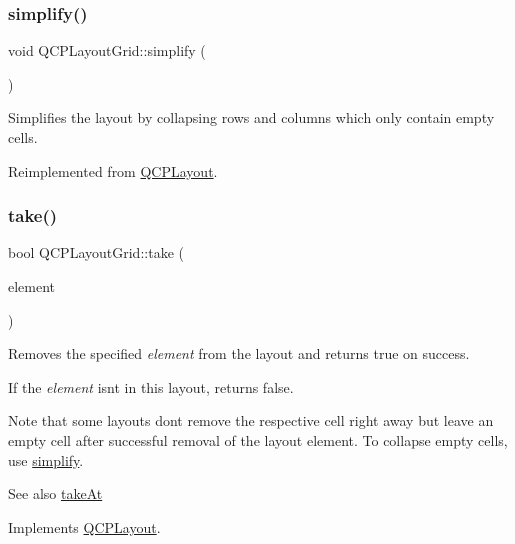 \subsubsection{\texorpdfstring{simplify()}{simplify()}}
{\footnotesize\ttfamily void Q\+C\+P\+Layout\+Grid\+::simplify (\begin{DoxyParamCaption}{ }\end{DoxyParamCaption})\hspace{0.3cm}{\ttfamily [virtual]}}

Simplifies the layout by collapsing rows and columns which only contain empty cells. 

Reimplemented from \hyperlink{class_q_c_p_layout_a41e6ac049143866e8f8b4964efab01b2}{Q\+C\+P\+Layout}.

\mbox{\label{class_q_c_p_layout_grid_aee961c2eb6cf8a85dcbc5a7d7b6c1a00}} 
\subsubsection{\texorpdfstring{take()}{take()}}
{\footnotesize\ttfamily bool Q\+C\+P\+Layout\+Grid\+::take (\begin{DoxyParamCaption}\item[{\hyperlink{class_q_c_p_layout_element}{Q\+C\+P\+Layout\+Element} $\ast$}]{element }\end{DoxyParamCaption})\hspace{0.3cm}{\ttfamily [virtual]}}

Removes the specified {\itshape element} from the layout and returns true on success.

If the {\itshape element} isn\textquotesingle{}t in this layout, returns false.

Note that some layouts don\textquotesingle{}t remove the respective cell right away but leave an empty cell after successful removal of the layout element. To collapse empty cells, use \hyperlink{class_q_c_p_layout_grid_a38621ca7aa633b6a9a88617df7f08672}{simplify}.

\begin{DoxySeeAlso}{See also}
\hyperlink{class_q_c_p_layout_grid_a17dd220234d1bbf8835abcc666384d45}{take\+At} 
\end{DoxySeeAlso}


Implements \hyperlink{class_q_c_p_layout_ada26cd17e56472b0b4d7fbbc96873e4c}{Q\+C\+P\+Layout}.


